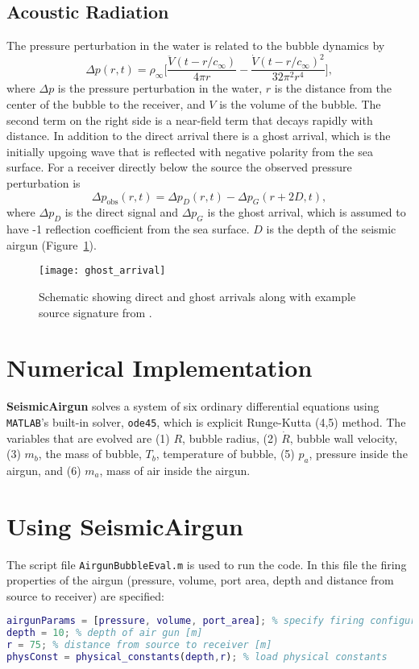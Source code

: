 \documentclass[10pt]{article}
\begin{document}
\subsection{Acoustic Radiation}
The pressure perturbation in the water is related to the bubble dynamics by \citep{Keller1956}
\begin{equation}
\Delta p(r,t) = \rho_\infty \bigg[ \frac{\ddot{V}(t-r/c_\infty)}{4\pi r} - \frac{\dot{V}(t-r/c_\infty)^2}{32\pi^2r^4} \bigg],
\label{eq:acoustic radiation}
\end{equation}
where $\Delta p$ is the pressure perturbation in the water, $r$ is the distance from the center of the bubble to the receiver, and $V$ is the volume of the bubble. The second term on the right side is a near-field term that decays rapidly with distance. In addition to the direct arrival there is a ghost arrival, which is the initially upgoing wave that is reflected with negative polarity from the sea surface. For a receiver directly below the source the observed pressure perturbation is
\begin{equation}
\Delta p_\text{obs}(r,t) = \Delta p_D(r,t) - \Delta p_G(r+2D,t),
\end{equation}
where $\Delta p_D$ is the direct signal and $\Delta p_G$ is the ghost arrival, which is assumed to have -1 reflection coefficient from the sea surface. $D$ is the depth of the seismic airgun (Figure~\ref{fig:ghost}).

\begin{figure}[h!]
\centering
\texttt{[image: ghost\_arrival]}
\caption{Schematic showing direct and ghost arrivals along with example source signature from \citet{Watson2016}.}
\label{fig:ghost}
\end{figure}

\section{Numerical Implementation}
{\bf SeismicAirgun} solves a system of six ordinary differential equations using \texttt{MATLAB}'s built-in solver, \texttt{ode45}, which is explicit Runge-Kutta (4,5) method. The variables that are evolved are (1) $R$, bubble radius, (2) $\dot{R}$, bubble wall velocity, (3) $m_b$, the mass of bubble, $T_b$, temperature of bubble, (5) $p_a$, pressure inside the airgun, and (6) $m_a$, mass of air inside the airgun. 

\section{Using {\bf SeismicAirgun}}
The script file \texttt{AirgunBubbleEval.m} is used to run the code. In this file the firing properties of the airgun (pressure, volume, port area, depth and distance from source to receiver) are specified:
\begin{lstlisting}[language=Matlab]
airgunParams = [pressure, volume, port_area]; % specify firing configuration [psi, in^3, in^2]
depth = 10; % depth of air gun [m]
r = 75; % distance from source to receiver [m]
physConst = physical_constants(depth,r); % load physical constants
\end{lstlisting}
\end{document}
